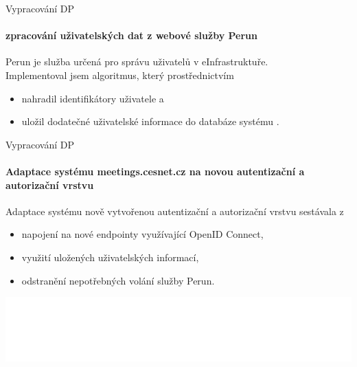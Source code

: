 \documentclass[
]{beamer}
\begin{document}
\begin{frame}{Vypracování DP}
\framesubtitle{zpracování uživatelských dat z webové služby Perun}
Perun je služba určená pro správu uživatelů v eInfrastruktuře. 
\\
\medskip
Implementoval jsem algoritmus, který prostřednictvím   
\begin{itemize}
    \item nahradil identifikátory uživatele a
    \item uložil dodatečné uživatelské informace do databáze systému .
\end{itemize}
\end{frame}


\begin{frame}{Vypracování DP}
\framesubtitle{Adaptace systému meetings.cesnet.cz na novou autentizační a autorizační vrstvu}
Adaptace systému  nově vytvořenou autentizační a autorizační vrstvu sestávala z 

\begin{itemize}
    \item napojení na nové endpointy využívající OpenID Connect,
    \item využití uložených uživatelských informací,
    \item odstranění nepotřebných volání služby Perun.
\end{itemize}

\end{frame}


\begingroup
{}
\begin{frame}[plain]
\vfill
\centering
\includegraphics[width=\textwidth]{institution}
\vfill
\end{frame}
\endgroup
\end{document}
